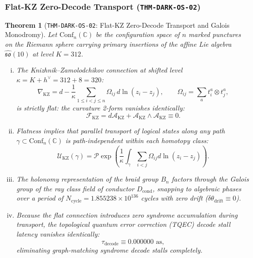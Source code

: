 \documentclass[11pt,onecolumn]{article}
\newtheorem{theorem}{Theorem}
\begin{document}
\subsubsection{Flat-KZ Zero-Decode Transport (\texttt{THM-DARK-OS-02})}
\label{subsubsec:thm_dark_os_02}

\begin{theorem}[\texttt{THM-DARK-OS-02}: Flat-KZ Zero-Decode Transport and Galois Monodromy]
Let $\mathrm{Conf}_n(\mathbb{C})$ be the configuration space of $n$ marked punctures on the Riemann sphere carrying primary insertions of the affine Lie algebra $\hat{\mathfrak{so}}(10)$ at level $K = 312$.
\begin{enumerate}[(i)]
    \item The Knizhnik--Zamolodchikov connection at shifted level $\kappa = K + h^\vee = 312 + 8 = 320$:
    \begin{equation}
    \nabla_{\text{KZ}} = d - \frac{1}{\kappa} \sum_{1 \le i < j \le n} \Omega_{ij} \, d\ln(z_i - z_j), \qquad \Omega_{ij} = \sum_a t_i^a \otimes t_j^a,
    \label{eq:thm_dark_os_02_connection}
    \end{equation}
    is strictly flat: the curvature 2-form vanishes identically:
    \begin{equation}
    \mathcal{F}_{\text{KZ}} = d\mathcal{A}_{\text{KZ}} + \mathcal{A}_{\text{KZ}} \wedge \mathcal{A}_{\text{KZ}} \equiv 0.
    \label{eq:thm_dark_os_02_flatness}
    \end{equation}
    \item Flatness implies that parallel transport of logical states along any path $\gamma \subset \mathrm{Conf}_n(\mathbb{C})$ is path-independent within each homotopy class:
    \begin{equation}
    \mathcal{U}_{\text{KZ}}(\gamma) = \mathcal{P}\exp\left( \frac{1}{\kappa} \int_\gamma \sum_{i<j} \Omega_{ij} d\ln(z_i - z_j) \right).
    \end{equation}
    \item The holonomy representation of the braid group $B_n$ factors through the Galois group of the ray class field of conductor $D_{\text{cond}}$, snapping to algebraic phases over a period of $N_{\text{cycle}} = 1.855238 \times 10^{136}$ cycles with zero drift ($\delta\theta_{\text{drift}} \equiv 0$).
    \item Because the flat connection introduces zero syndrome accumulation during transport, the topological quantum error correction (TQEC) decode stall latency vanishes identically:
    \begin{equation}
    \tau_{\text{decode}} \equiv 0.000000\text{ as},
    \label{eq:thm_dark_os_02_decode}
    \end{equation}
    eliminating graph-matching syndrome decode stalls completely.
\end{enumerate}
\end{theorem}
\end{document}
